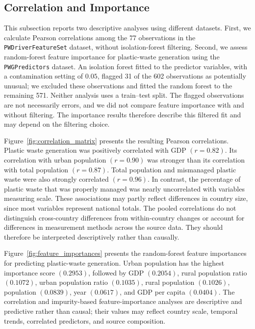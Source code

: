 \subsection{Correlation and Importance}

This subsection reports two descriptive analyses using different datasets.
First, we calculate Pearson correlations among the 77 observations in the \texttt{PWDriverFeatureSet} dataset, without isolation-forest filtering.
Second, we assess random-forest feature importance for plastic-waste generation using the \texttt{PWGPredictors} dataset.
An isolation forest fitted to the predictor variables, with a contamination setting of \(0.05\), flagged 31 of the 602 observations as potentially unusual; we excluded these observations and fitted the random forest to the remaining 571.
Neither analysis uses a train--test split.
The flagged observations are not necessarily errors, and we did not compare feature importance with and without filtering.
The importance results therefore describe this filtered fit and may depend on the filtering choice.

Figure~\ref{fig:correlation_matrix} presents the resulting Pearson correlations.
Plastic waste generation was positively correlated with GDP \((r = 0.82)\).
Its correlation with urban population \((r = 0.90)\) was stronger than its correlation with total population \((r = 0.87)\).
Total population and mismanaged plastic waste were also strongly correlated \((r = 0.96)\).
In contrast, the percentage of plastic waste that was properly managed was nearly uncorrelated with variables measuring scale.
These associations may partly reflect differences in country size, since most variables represent national totals.
The pooled correlations do not distinguish cross-country differences from within-country changes or account for differences in measurement methods across the source data.
They should therefore be interpreted descriptively rather than causally.



Figure~\ref{fig:feature_importances} presents the random-forest feature importances for predicting plastic-waste generation.
Urban population has the highest importance score \((0.2953)\), followed by GDP \((0.2054)\), rural population ratio \((0.1072)\), urban population ratio \((0.1035)\), rural population \((0.1026)\), population \((0.0839)\), year \((0.0617)\), and GDP per capita \((0.0404)\).
The correlation and impurity-based feature-importance analyses are descriptive and predictive rather than causal; their values may reflect country scale, temporal trends, correlated predictors, and source composition.


